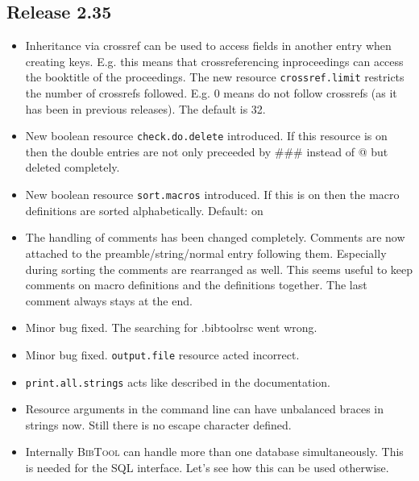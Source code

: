 \documentclass[11pt,a4paper]{scrartcl}
\newcommand\rsc[1]{\texttt{#1}}
\newcommand\File[1]{\textsf{#1}}
\newcommand\BibTool{\textsc{BibTool}}
\newenvironment{Release}[2]{%
  \def\tmp{#2}%
  \section*{Release #1 \ifx\tmp\empty\else{\normalsize[#2]}\fi}
  \begin{itemize}
}{\end{itemize}}
\newenvironment{Fix}[1]{\item }{}
\newenvironment{New}[1]{\item }{}
\newenvironment{Update}[1]{\item }{}
\begin{document}
\begin{multicols}
 \begin{Release}{2.35}{}
  \begin{Update}{gene}
    Inheritance via crossref can be used to access fields in another
    entry when creating keys. E.g. this means that crossreferencing
    inproceedings can access the booktitle of the proceedings. The new
    resource \rsc{crossref.limit} restricts the number of crossrefs
    followed. E.g. 0 means do not follow crossrefs (as it has been in
    previous releases). The default is 32.
  \end{Update}
  \begin{New}{gene}
    New boolean resource \rsc{check.do.delete} introduced. If this
    resource is on then the double entries are not only preceeded by
    \#\#\# instead of @ but deleted completely.
  \end{New}
  \begin{New}{gene}
    New boolean resource \rsc{sort.macros} introduced. If this is on
    then the macro definitions are sorted alphabetically. Default: on
  \end{New}
  \begin{Update}{gene}
    The handling of comments has been changed completely. Comments are
    now attached to the preamble/string/normal entry following them.
    Especially during sorting the comments are rearranged as well.
    This seems useful to keep comments on macro definitions and the
    definitions together. The last comment always stays at the end.
  \end{Update}
  \begin{Fix}{gene}
    Minor bug fixed. The searching for \File{.bibtoolrsc} went wrong.
  \end{Fix}
  \begin{Fix}{gene}
    Minor bug fixed. \rsc{output.file} resource acted incorrect.
  \end{Fix}
  \begin{New}{gene}
    \rsc{print.all.strings} acts like described in the documentation.
  \end{New}
  \begin{Update}{gene}
    Resource arguments in the command line can have unbalanced braces in
    strings now. Still there is no escape character defined.
  \end{Update}
  \begin{Update}{gene}
    Internally \BibTool{} can handle more than one database simultaneously.
    This is needed for the SQL interface. Let's see how this can be used
    otherwise.
  \end{Update}
 \end{Release}


\end{multicols}
\end{document}
